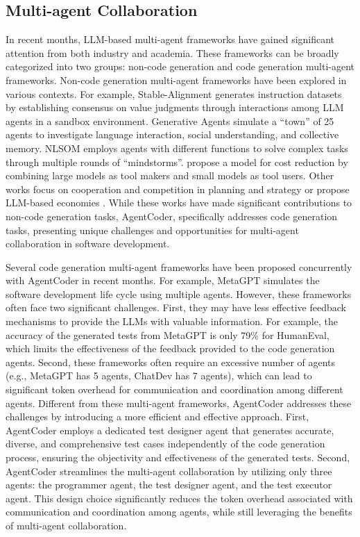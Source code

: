 \documentclass{article}
\newcommand{\xxx}{AgentCoder\xspace}
\begin{document}
\subsection{Multi-agent Collaboration}
In recent months, LLM-based multi-agent frameworks have gained significant attention from both industry and academia. These frameworks can be broadly categorized into two groups: non-code generation and code generation multi-agent frameworks. Non-code generation multi-agent frameworks have been explored in various contexts. For example, Stable-Alignment \cite{liu2023training} generates instruction datasets by establishing consensus on value judgments through interactions among LLM agents in a sandbox environment. Generative Agents \cite{park2023generative} simulate a ``town'' of 25 agents to investigate language interaction, social understanding, and collective memory. NLSOM \cite{zhuge2023mindstorms} employs agents with different functions to solve complex tasks through multiple rounds of ``mindstorms''. \citet{cai2023large} propose a model for cost reduction by combining large models as tool makers and small models as tool users. Other works focus on cooperation and competition in planning and strategy \cite{meta2022human} or propose LLM-based economies \cite{zhuge2023mindstorms}. While these works have made significant contributions to non-code generation tasks, AgentCoder, specifically addresses code generation tasks, presenting unique challenges and opportunities for multi-agent collaboration in software development.

Several code generation multi-agent frameworks \cite{hong2023metagpt,li2023camel,Chen2023AgentVerseFM,qian2023communicative} have been proposed concurrently with \xxx in recent months. For example, MetaGPT \cite{hong2023metagpt} simulates the software development life cycle using multiple agents. 
However, these frameworks often face two significant challenges. First, they may have less effective feedback mechanisms to provide the LLMs with valuable information. For example, the accuracy of the generated tests from MetaGPT \cite{hong2023metagpt} is only 79\% for HumanEval, which limits the effectiveness of the feedback provided to the code generation agents. Second, these frameworks often require an excessive number of agents (e.g., MetaGPT has 5 agents, ChatDev has 7 agents), which can lead to significant token overhead for communication and coordination among different agents.
Different from these multi-agent frameworks, \xxx addresses these challenges by introducing a more efficient and effective approach. First, \xxx employs a dedicated test designer agent that generates accurate, diverse, and comprehensive test cases independently of the code generation process, ensuring the objectivity and effectiveness of the generated tests. Second, \xxx streamlines the multi-agent collaboration by utilizing only three agents: the programmer agent, the test designer agent, and the test executor agent. This design choice significantly reduces the token overhead associated with communication and coordination among agents, while still leveraging the benefits of multi-agent collaboration. 
\end{document}
